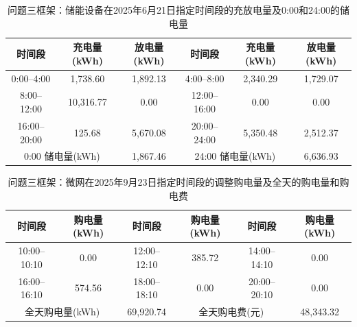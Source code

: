 \begin{table}[H]
  \centering
  \caption{问题三框架：储能设备在2025年6月21日指定时间段的充放电量及0:00和24:00的储电量}
  \label{tab:q4-3-storage-0621}
  \small
  \renewcommand{\arraystretch}{1.3}
  \begin{tabular}{|c|c|c|c|c|c|}
    \hline
    时间段 & 充电量(kWh) & 放电量(kWh) & 时间段 & 充电量(kWh) & 放电量(kWh) \\
    \hline
    0:00--4:00 & 1{,}738.60 & 1{,}892.13 & 4:00--8:00 & 2{,}340.29 & 1{,}729.07 \\
    \hline
    8:00--12:00 & 10{,}316.77 & 0.00 & 12:00--16:00 & 0.00 & 0.00 \\
    \hline
    16:00--20:00 & 125.68 & 5{,}670.08 & 20:00--24:00 & 5{,}350.48 & 2{,}512.37 \\
    \hline
    \multicolumn{2}{|c|}{0:00 储电量(kWh)} & \multicolumn{1}{c|}{1{,}867.46} & \multicolumn{2}{c|}{24:00 储电量(kWh)} & \multicolumn{1}{c|}{6{,}636.93} \\
    \hline
  \end{tabular}
\end{table}

\begin{table}[H]
  \centering
  \caption{问题三框架：微网在2025年9月23日指定时间段的调整购电量及全天的购电量和购电费}
  \label{tab:q4-3-adj-0923}
  \small
  \renewcommand{\arraystretch}{1.3}
  \begin{tabular}{|c|c|c|c|c|c|}
    \hline
    时间段 & 购电量(kWh) & 时间段 & 购电量(kWh) & 时间段 & 购电量(kWh) \\
    \hline
    10:00--10:10 & 0.00 & 12:00--12:10 & 385.72 & 14:00--14:10 & 0.00 \\
    \hline
    16:00--16:10 & 574.56 & 18:00--18:10 & 0.00 & 20:00--20:10 & 0.00 \\
    \hline
    \multicolumn{2}{|c|}{全天购电量(kWh)} & \multicolumn{1}{c|}{69{,}920.74} & \multicolumn{2}{c|}{全天购电费(元)} & \multicolumn{1}{c|}{48{,}343.32} \\
    \hline
  \end{tabular}
\end{table}

